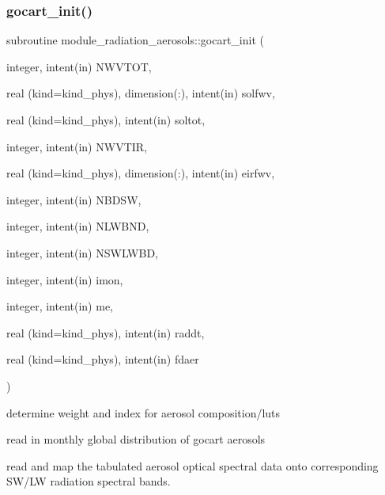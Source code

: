 \subsubsection{\texorpdfstring{gocart\+\_\+init()}{gocart\_init()}}
{\footnotesize\ttfamily subroutine module\+\_\+radiation\+\_\+aerosols\+::gocart\+\_\+init (\begin{DoxyParamCaption}\item[{integer, intent(in)}]{N\+W\+V\+T\+OT,  }\item[{real (kind=kind\+\_\+phys), dimension(\+:), intent(in)}]{solfwv,  }\item[{real (kind=kind\+\_\+phys), intent(in)}]{soltot,  }\item[{integer, intent(in)}]{N\+W\+V\+T\+IR,  }\item[{real (kind=kind\+\_\+phys), dimension(\+:), intent(in)}]{eirfwv,  }\item[{integer, intent(in)}]{N\+B\+D\+SW,  }\item[{integer, intent(in)}]{N\+L\+W\+B\+ND,  }\item[{integer, intent(in)}]{N\+S\+W\+L\+W\+BD,  }\item[{integer, intent(in)}]{imon,  }\item[{integer, intent(in)}]{me,  }\item[{real (kind=kind\+\_\+phys), intent(in)}]{raddt,  }\item[{real (kind=kind\+\_\+phys), intent(in)}]{fdaer }\end{DoxyParamCaption})\hspace{0.3cm}{\ttfamily [private]}}


\begin{DoxyItemize}
\item determine weight and index for aerosol composition/luts
\item read in monthly global distribution of gocart aerosols
\item read and map the tabulated aerosol optical spectral data onto corresponding S\+W/\+LW radiation spectral bands.
\end{DoxyItemize}



